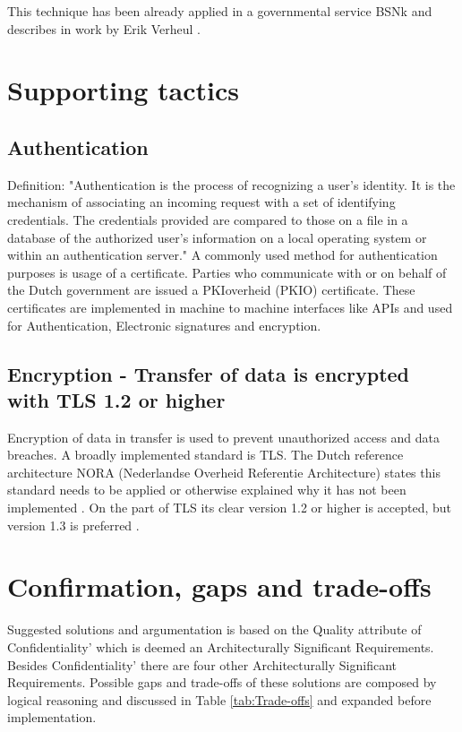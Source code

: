 This technique has been already applied in a governmental service BSNk \cite{Logius_BSNk} and describes in work by Erik Verheul \cite{VerheuleID}.

\section{Supporting tactics}

\subsection{Authentication} \label{authentication}
Definition: "Authentication is the process of recognizing a user’s identity. It is the mechanism of associating an incoming request with a set of identifying credentials. The credentials provided are compared to those on a file in a database of the authorized user’s information on a local operating system or within an authentication server." \cite{authentication}
A commonly used method for authentication purposes is usage of a certificate. Parties who communicate with or on behalf of the Dutch government are issued a PKIoverheid (PKIO) certificate. These certificates are implemented in machine to machine interfaces like APIs and used for Authentication, Electronic signatures and encryption. \cite{Logius_PKIO}

\subsection{Encryption - Transfer of data is encrypted with TLS 1.2 or higher} \label{encryption}
Encryption of data in transfer is used to prevent unauthorized access and data breaches. A broadly implemented standard is TLS. The Dutch reference architecture NORA (Nederlandse Overheid Referentie Architecture) \cite{NORA} states this standard needs to be applied or otherwise explained why it has not been implemented \cite{NORA_PasToeOfLegUit}. On the part of TLS its clear version 1.2 or higher is accepted, but version 1.3 is preferred \cite{NORA_TLS}. 

\section{Confirmation, gaps and trade-offs}
Suggested solutions and argumentation is based on the Quality attribute of Confidentiality' which is deemed an Architecturally Significant Requirements. Besides Confidentiality' there are four other Architecturally Significant Requirements. Possible gaps and trade-offs of these solutions are composed by logical reasoning and discussed in Table \ref{tab:Trade-offs} and expanded before implementation.

